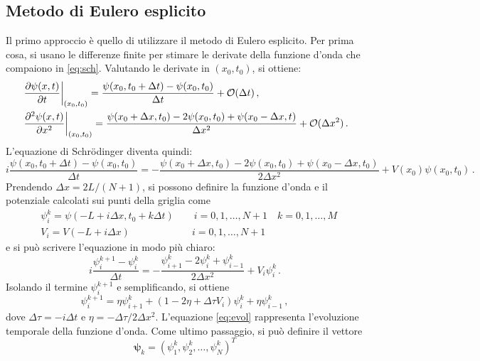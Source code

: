 \documentclass[a4paper, titlepage]{article}
\numberwithin{equation}{section}
\begin{document}
\subsection{Metodo di Eulero esplicito}
Il primo approccio è quello di utilizzare il metodo di Eulero esplicito. 
Per prima cosa, si usano le differenze finite per stimare le derivate della funzione d'onda che compaiono in \eqref{eq:sch}. Valutando le derivate in $(x_0, t_0)$, si ottiene:
\begin{align*}
    &\left.\pdv{\psi(x, t)}{t}\right\vert_{(x_0, t_0)} = \frac{\psi(x_0, t_0 + \Delta t) - \psi(x_0, t_0)}{\Delta t} + \mathcal{O}(\Delta t)\, , \\
    &\left.\pdv[2]{\psi(x, t)}{x}\right\vert_{(x_0, t_0)} = \frac{\psi(x_0 + \Delta x, t_0) - 2\psi(x_0, t_0) + \psi(x_0 - \Delta x, t)}{\Delta x^2} + \mathcal{O}(\Delta x^2)\, .
\end{align*}
L'equazione di Schrödinger diventa quindi:
\begin{equation*}
    i \frac{\psi(x_0, t_0 + \Delta t) - \psi(x_0, t_0)}{\Delta t} = 
    - \frac{\psi(x_0 + \Delta x, t_0) - 2\psi(x_0, t_0) + \psi(x_0 - \Delta x, t_0)}{2\Delta x^2} + V(x_0)\psi(x_0, t_0)\, .
\end{equation*}
Prendendo $\Delta x = 2L/(N+1)$, si possono definire la funzione d'onda e il potenziale calcolati sui punti della griglia come
\begin{align*}
    &\psi_i^k = \psi(-L + i\Delta x, t_0 + k\Delta t) \qquad i = 0,1,\dots,N+1 \quad k = 0,1,\dots,M \\
    &V_i = V(-L + i\Delta x) \qquad\qquad\qquad\ i = 0,1,\dots,N+1
\end{align*}
e si può scrivere l'equazione in modo più chiaro:
\begin{equation*}
    i \frac{\psi_i^{k+1} - \psi_i^k}{\Delta t} = 
    - \frac{\psi_{i+1}^k - 2\psi_i^k + \psi_{i-1}^k}{2\Delta x^2} + V_i\psi_i^k\, .
\end{equation*}
Isolando il termine $\psi_i^{k+1}$ e semplificando, si ottiene
\begin{equation}
    \psi_i^{k+1} = \eta \psi_{i+1}^k + (1 - 2\eta + \Delta\tau V_i)\psi_i^k + \eta\psi_{i-1}^k\, ,
    \label{eq:evol}
\end{equation}
dove $\Delta\tau = -i\Delta t$ e $\eta = - \Delta\tau/2\Delta x^2$. L'equazione \eqref{eq:evol} rappresenta l'evoluzione temporale della funzione d'onda. Come ultimo passaggio, si può definire il vettore
\begin{equation*}
    \bm{\psi}_k = (\psi_1^k,\psi_2^k,\dots,\psi_N^k)^T
\end{equation*}
\end{document}
